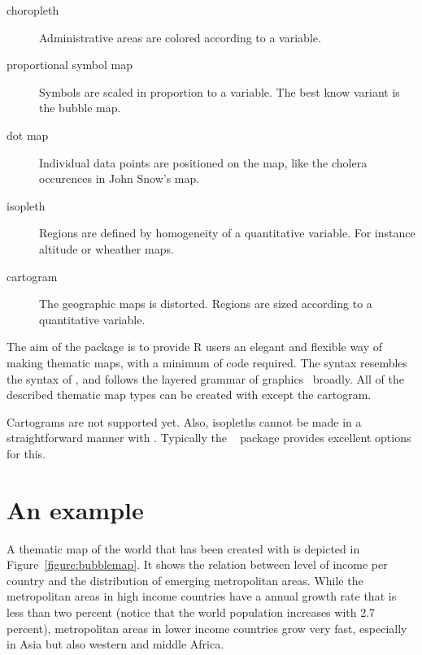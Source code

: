 \begin{description}
\item[choropleth] Administrative areas are colored according to a variable.
\item[proportional symbol map] Symbols are scaled in proportion to a variable. The best know variant is the bubble map.
\item[dot map] Individual data points are positioned on the map, like the cholera occurences in John Snow's map.
\item[isopleth] Regions are defined by homogeneity of a quantitative variable. For instance altitude or wheather maps.
\item[cartogram] The geographic maps is distorted. Regions are sized according to a quantitative variable.
\end{description}



The aim of the  package is to provide R users an elegant and flexible way of making thematic maps, with a minimum of code required. The syntax resembles the syntax of , and follows the layered grammar of graphics~\citep{wickham10} broadly. All of the described thematic map types can be created with  except the cartogram. 


Cartograms are not supported yet. Also, isopleths cannot be made in a straightforward manner with . Typically the ~\citep{raster} package provides excellent options for this.





%

\section{An example}

A thematic map of the world that has been created with  is depicted in Figure~\ref{figure:bubblemap}. It shows the relation between level of income per country and the distribution of emerging metropolitan areas. While the metropolitan areas in high income countries have a annual growth rate that is less than two percent (notice that the world population increases with 2.7 percent), metropolitan areas in lower income countries grow very fast, especially in Asia but also western and middle Africa.

